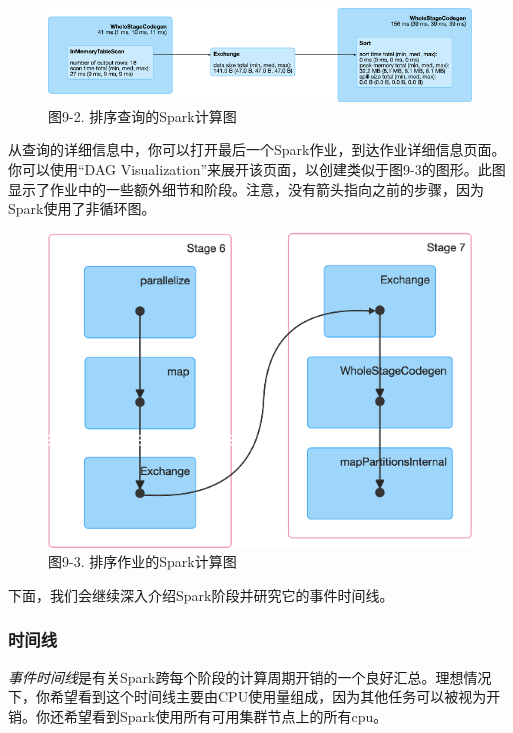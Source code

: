 \documentclass[
]{article}
\begin{document}
\begin{figure}
\centering
\includegraphics{figures/9_2.png}
\caption{图9-2. 排序查询的Spark计算图}
\end{figure}

从查询的详细信息中，你可以打开最后一个Spark作业，到达作业详细信息页面。你可以使用``DAG
Visualization''来展开该页面，以创建类似于图9-3的图形。此图显示了作业中的一些额外细节和阶段。注意，没有箭头指向之前的步骤，因为Spark使用了非循环图。

\begin{figure}
\centering
\includegraphics{figures/9_3.png}
\caption{图9-3. 排序作业的Spark计算图}
\end{figure}

下面，我们会继续深入介绍Spark阶段并研究它的事件时间线。

\hypertarget{ux65f6ux95f4ux7ebf}{%
\subsubsection{时间线}\label{ux65f6ux95f4ux7ebf}}

\emph{事件时间线}是有关Spark跨每个阶段的计算周期开销的一个良好汇总。理想情况下，你希望看到这个时间线主要由CPU使用量组成，因为其他任务可以被视为开销。你还希望看到Spark使用所有可用集群节点上的所有cpu。
\end{document}
